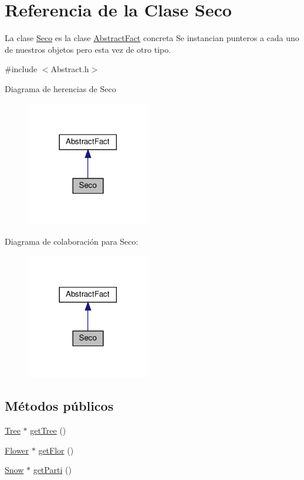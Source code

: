 \hypertarget{classSeco}{}\section{Referencia de la Clase Seco}
\label{classSeco}


La clase \hyperlink{classSeco}{Seco} es la clase \hyperlink{classAbstractFact}{Abstract\+Fact} concreta  Se instancian punteros a cada uno de nuestros objetos pero esta vez de otro tipo.  




{\ttfamily \#include $<$Abstract.\+h$>$}



Diagrama de herencias de Seco
\nopagebreak
\begin{figure}[H]
\begin{center}
\leavevmode
\includegraphics[width=153pt]{classSeco__inherit__graph}
\end{center}
\end{figure}


Diagrama de colaboración para Seco\+:
\nopagebreak
\begin{figure}[H]
\begin{center}
\leavevmode
\includegraphics[width=153pt]{classSeco__coll__graph}
\end{center}
\end{figure}
\subsection*{Métodos públicos}
\begin{DoxyCompactItemize}
\item 
\hyperlink{classTree}{Tree} $\ast$ \hyperlink{classSeco_ae4a078cccba29b3d89dcb62b6eeaa269}{get\+Tree} ()
\item 
\hyperlink{classFlower}{Flower} $\ast$ \hyperlink{classSeco_a91092401b16231a926255323e89c6412}{get\+Flor} ()
\item 
\hyperlink{classSnow}{Snow} $\ast$ \hyperlink{classSeco_acd61763141ecdb895062cdde7defa800}{get\+Parti} ()
\end{DoxyCompactItemize}


